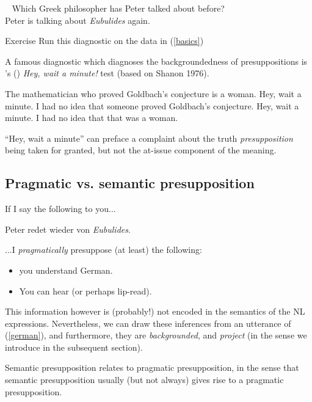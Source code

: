 \documentclass[cronos,landscape,paper=letter]{ling-handout}
\begin{document}
\ex~\label{q2}
Which Greek philosopher has Peter talked about before?\\
\ljudge{\#}Peter is talking about \textit{Eubulides} again.
\xe

\begin{tcolorbox}
Exercise
\tcblower
Run this diagnostic on the data in (\ref{basics})
\end{tcolorbox}

A famous diagnostic which diagnoses the backgroundedness of presuppositions is \citeauthor{fintel2004}'s (\citeyear{fintel2004}) \textit{Hey, wait a minute!} test (based on Shanon 1976).

\pex
The mathematician who proved Goldbach's conjecture is a woman.
\a Hey, wait a minute. I had no idea that someone proved Goldbach's conjecture.
\a\ljudge{\#}Hey, wait a minute. I had no idea that that was a woman.
\xe

\enquote{Hey, wait a minute} can preface a complaint about the truth \textit{presupposition} being taken for granted, but not the at-issue component of the meaning.

\subsection{Pragmatic vs. semantic presupposition}

If I say the following to you...

\ex
\label{german}Peter redet wieder von \textit{Eubulides}.
\xe

...I \textit{pragmatically} presuppose (at least) the following:

\begin{itemize}

  \item you understand German.

  \item You can hear (or perhaps lip-read).

\end{itemize}

This information however is (probably!) not encoded in the semantics of the NL expressions. Nevertheless, we can draw these inferences from an utterance of (\ref{german}), and furthermore, they are \textit{backgrounded}, and \textit{project} (in the sense we introduce in the subsequent section).

Semantic presupposition relates to pragmatic presupposition, in the sense that semantic presupposition usually (but not always) gives rise to a pragmatic presupposition.
\end{document}
